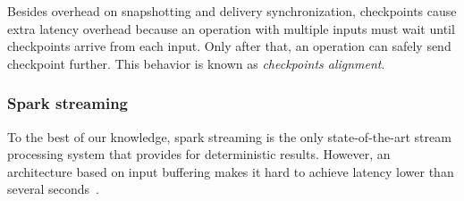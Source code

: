 Besides overhead on snapshotting and delivery synchronization, checkpoints cause extra latency overhead because an operation with multiple inputs must wait until checkpoints arrive from each input. Only after that, an operation can safely send checkpoint further. This behavior is known as {\em checkpoints alignment}.

\subsubsection{Spark streaming}

To the best of our knowledge, spark streaming is the only state-of-the-art stream processing system that provides for deterministic results. However, an architecture based on input buffering makes it hard to achieve latency lower than several seconds~\cite{7530084, 7474816}. 
